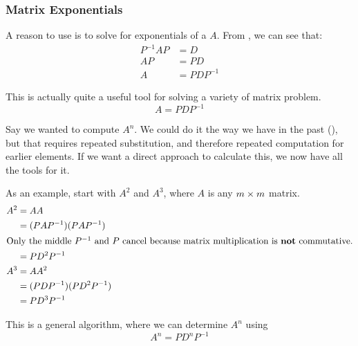\subsubsection{Matrix Exponentials}\label{subsubsec:Matrix_Exponentials}
A reason to use  is to solve for exponentials of a  $A$.
From , we can see that:
\begin{align*}
  P^{-1} A P &= D \\
  AP &= PD \\
  A &= P D P^{-1}
\end{align*}

This is actually quite a useful tool for solving a variety of matrix problem.
\begin{equation}\label{eq:Diagonalizable_A}
  A = P D P^{-1}
\end{equation}

Say we wanted to compute $A^{n}$.
We could do it the way we have in the past (), but that requires repeated substitution, and therefore repeated computation for earlier elements.
If we want a direct approach to calculate this, we now have all the tools for it.

\begin{blackbox}
  As an example, start with $A^{2}$ and $A^{3}$, where $A$ is any $m \times m$ matrix.
  \begin{align*}
    A^{2} &= A A \\
          &= (P A P^{-1}) (P A P^{-1}) \\
    \intertext{Only the middle $P^{-1}$ and $P$ cancel because matrix multiplication is \textbf{not} commutative.}
          &= P D^{2} P^{-1} \\
    A^{3} &= A A^{2} \\
          &= (P D P^{-1}) (P D^{2} P^{-1}) \\
          &= P D^{3} P^{-1}
  \end{align*}
\end{blackbox}

This is a general algorithm, where we can determine $A^{n}$ using 
\begin{equation}\label{eq:Matrix_Exponent_Diagonalized}
  A^{n} = P D^{n} P^{-1}
\end{equation}

